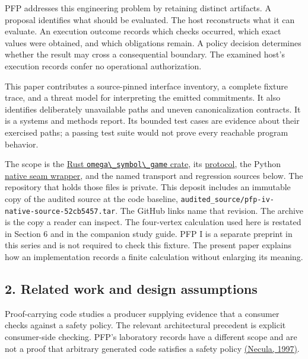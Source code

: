 \documentclass[
  11pt,
]{article}
\newcommand{\passthrough}[1]{#1}
\begin{document}
PFP addresses this engineering problem by retaining distinct artifacts.
A proposal identifies what should be evaluated. The host reconstructs
what it can evaluate. An execution outcome records which checks
occurred, which exact values were obtained, and which obligations
remain. A policy decision determines whether the result may cross a
consequential boundary. The examined host's execution records confer no
operational authorization.

This paper contributes a source-pinned interface inventory, a complete
fixture trace, and a threat model for interpreting the emitted
commitments. It also identifies deliberately unavailable paths and
uneven canonicalization contracts. It is a systems and methods report.
Its bounded test cases are evidence about their exercised paths; a
passing test suite would not prove every reachable program behavior.

The scope is the
\href{https://github.com/dbccpage/the_symbol_game/tree/52cb5457f6c485ba548cfd292f6012a941ed22cf/engine/crates_rs/core_symbol_game}{Rust
\passthrough{\lstinline!omega\_symbol\_game!} crate}, its
\href{https://github.com/dbccpage/the_symbol_game/blob/52cb5457f6c485ba548cfd292f6012a941ed22cf/engine/crates_rs/core_symbol_game/src/protocol.rs}{protocol},
the Python
\href{https://github.com/dbccpage/the_symbol_game/blob/52cb5457f6c485ba548cfd292f6012a941ed22cf/symbol_game/ffi.py}{native
seam wrapper}, and the named transport and regression sources below. The
repository that holds those files is private. This deposit includes an
immutable copy of the audited source at the code baseline,
\nolinkurl{audited_source/pfp-iv-native-source-52cb5457.tar}. The GitHub
links name that revision. The archive is the copy a reader can inspect.
The four-vertex calculation used here is restated in Section 6 and in
the companion study guide. PFP I is a separate preprint in this series
and is not required to check this fixture. The present paper explains
how an implementation records a finite calculation without enlarging its
meaning.

\subsection{2. Related work and design
assumptions}\label{related-work-and-design-assumptions}

Proof-carrying code studies a producer supplying evidence that a
consumer checks against a safety policy. The relevant architectural
precedent is explicit consumer-side checking. PFP's laboratory records
have a different scope and are not a proof that arbitrary generated code
satisfies a safety policy
\href{https://doi.org/10.1145/263699.263712}{(Necula, 1997)}.
\end{document}

